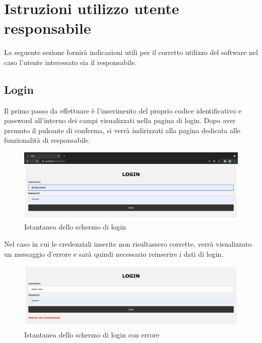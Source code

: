 \section{Istruzioni utilizzo utente responsabile}

La seguente sezione fornirà indicazioni utili per il corretto utilizzo del software nel caso l'utente interessato sia il responsabile.

\subsection{Login}
Il primo passo da effettuare è l'inserimento del proprio codice identificativo e password all'interno dei campi visualizzati nella pagina di login. Dopo aver premuto il pulsante di conferma, si verrà indirizzati alla pagina dedicata alle funzionalità di responsabile. 
\begin{figure}[H]
    \centering
    \includegraphics[scale=0.2]{res/images/login2.png}
    \caption{Istantanea dello schermo di login}
\end{figure}
Nel caso in cui le credenziali inserite non risultassero corrette, verrà visualizzato un messaggio d'errore e sarà quindi necessario reinserire i dati di login.
\begin{figure}[H]
    \centering
    \includegraphics[scale=0.3]{res/images/login_errato2.png}
    \caption{Istantanea dello schermo di login con errore}
\end{figure}

